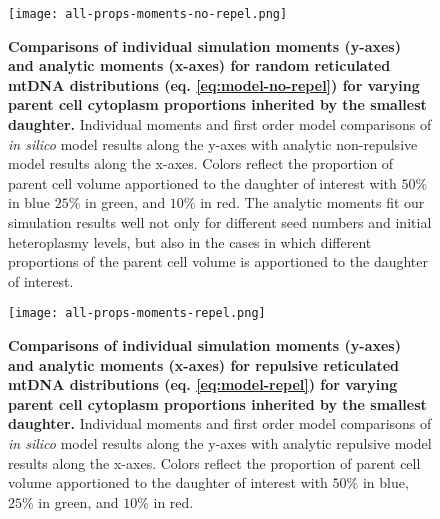 \documentclass{article}
\begin{document}
\begin{appendices}
\begin{figure}[!ht]
\end{figure}
\begin{figure}
        \centering \texttt{[image: all-props-moments-no-repel.png]}
        \caption{\textbf{Comparisons of individual simulation moments (y-axes) and analytic moments (x-axes) for random reticulated mtDNA distributions (eq. \ref{eq:model-no-repel}) for varying parent cell cytoplasm proportions inherited by the smallest daughter.} Individual moments and first order model comparisons of \textit{in silico} model results along the y-axes with analytic non-repulsive model results along the x-axes. Colors reflect the proportion of parent cell volume apportioned to the daughter of interest with $50\%$ in blue $25\%$ in green, and $10\%$ in red. The analytic moments fit our simulation results well not only for different seed numbers and initial heteroplasmy levels, but also in the cases in which different proportions of the parent cell volume is apportioned to the daughter of interest.
        }\label{fig:app-moments-no-repel}
\end{figure}
\begin{figure}
        \centering \texttt{[image: all-props-moments-repel.png]}
        \caption{\textbf{Comparisons of individual simulation moments (y-axes) and analytic moments (x-axes) for repulsive reticulated mtDNA distributions (eq. \ref{eq:model-repel}) for varying parent cell cytoplasm proportions inherited by the smallest daughter.} Individual moments and first order model comparisons of \textit{in silico} model results along the y-axes with analytic repulsive model results along the x-axes. Colors reflect the proportion of parent cell volume apportioned to the daughter of interest with $50\%$ in blue, $25\%$ in green, and $10\%$ in red.
        }\label{fig:app-moments-repel}
\end{figure}
\end{appendices}
\end{document}
